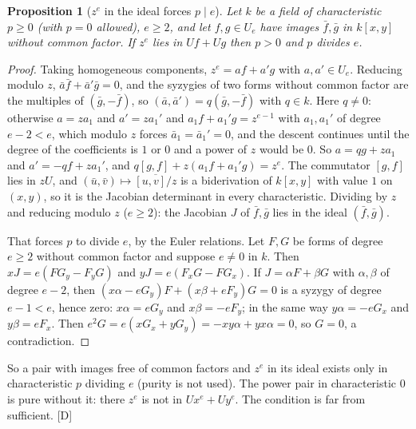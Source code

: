 \documentclass[11pt]{article}
\newtheorem{proposition}{Proposition}
\theoremstyle{definition}
\theoremstyle{remark}
\begin{document}
\begin{proposition}[$z^e$ in the ideal forces $p\mid e$]\label{prop:zpower}
Let $k$ be a field of characteristic $p\ge0$ (with $p=0$ allowed), $e\ge2$, and let $f,g\in U_e$ have images $\bar f,\bar g$ in $k[x,y]$ without common factor. If $z^e$ lies in $Uf+Ug$ then $p>0$ and $p$ divides $e$.
\end{proposition}
\begin{proof}
Taking homogeneous components, $z^e=af+a'g$ with $a,a'\in U_e$. Reducing modulo $z$, $\bar a\bar f+\bar a'\bar g=0$, and the syzygies of two forms without common factor are the multiples of $(\bar g,-\bar f)$, so $(\bar a,\bar a')=q(\bar g,-\bar f)$ with $q\in k$. Here $q\ne0$: otherwise $a=za_1$ and $a'=za_1'$ and $a_1f+a_1'g=z^{e-1}$ with $a_1,a_1'$ of degree $e-2<e$, which modulo $z$ forces $\bar a_1=\bar a_1'=0$, and the descent continues until the degree of the coefficients is $1$ or $0$ and a power of $z$ would be $0$. So $a=qg+za_1$ and $a'=-qf+za_1'$, and $q[g,f]+z(a_1f+a_1'g)=z^e$. The commutator $[g,f]$ lies in $zU$, and $(\bar u,\bar v)\mapsto\overline{[u,v]/z}$ is a biderivation of $k[x,y]$ with value $1$ on $(x,y)$, so it is the Jacobian determinant in every characteristic. Dividing by $z$ and reducing modulo $z$ ($e\ge2$): the Jacobian $J$ of $\bar f,\bar g$ lies in the ideal $(\bar f,\bar g)$.

That forces $p$ to divide $e$, by the Euler relations. Let $F,G$ be forms of degree $e\ge2$ without common factor and suppose $e\ne0$ in $k$. Then $xJ=e(FG_y-F_yG)$ and $yJ=e(F_xG-FG_x)$. If $J=\alpha F+\beta G$ with $\alpha,\beta$ of degree $e-2$, then $(x\alpha-eG_y)F+(x\beta+eF_y)G=0$ is a syzygy of degree $e-1<e$, hence zero: $x\alpha=eG_y$ and $x\beta=-eF_y$; in the same way $y\alpha=-eG_x$ and $y\beta=eF_x$. Then $e^2G=e(xG_x+yG_y)=-xy\alpha+yx\alpha=0$, so $G=0$, a contradiction.
\end{proof}
So a pair with images free of common factors and $z^e$ in its ideal exists only in characteristic $p$ dividing $e$ (purity is not used). The power pair in characteristic $0$ is pure without it: there $z^e$ is not in $Ux^e+Uy^e$. The condition is far from sufficient. [D]
\end{document}
